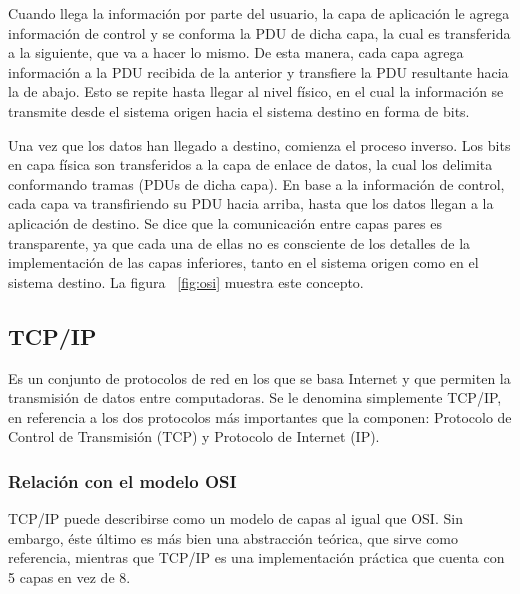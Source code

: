 Cuando llega la información por parte del usuario, la capa de aplicación le agrega información de control y se conforma la PDU de dicha capa, la cual es transferida a la siguiente, que va a hacer lo mismo. De esta manera, cada capa agrega información a la PDU recibida de la anterior y transfiere la PDU resultante hacia la de abajo. Esto se repite hasta llegar al nivel físico, en el cual la información se transmite desde el sistema origen hacia el sistema destino en forma de bits.

Una vez que los datos han llegado a destino, comienza el proceso inverso. Los bits en capa física son transferidos a la capa de enlace de datos, la cual los delimita conformando tramas (PDUs de dicha capa). En base a la información de control, cada capa va transfiriendo su PDU hacia arriba, hasta que los datos llegan a la aplicación de destino. Se dice que la comunicación entre capas pares es transparente, ya que cada una de ellas no es consciente de los detalles de la implementación de las capas inferiores, tanto en el sistema origen como en el sistema destino. La figura ~\ref{fig:osi} muestra este concepto.

\subsection{TCP/IP}

Es un conjunto de protocolos de red en los que se basa Internet y que permiten la transmisión de datos entre computadoras. Se le denomina simplemente TCP/IP, en referencia a los dos protocolos más importantes que la componen: Protocolo de Control de Transmisión (TCP) y Protocolo de Internet (IP).

\subsubsection{Relación con el modelo OSI}

TCP/IP puede describirse como un modelo de capas al igual que OSI. Sin embargo, éste último es más bien una abstracción teórica, que sirve como referencia, mientras que TCP/IP es una implementación práctica que cuenta con 5 capas en vez de 8.

